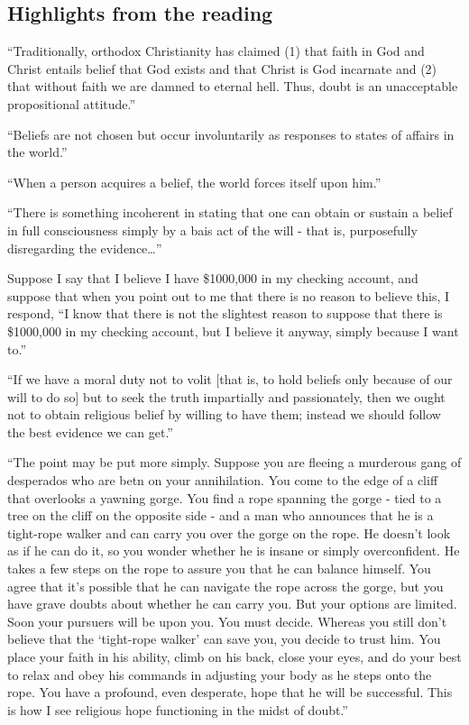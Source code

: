 \documentclass[
]{book}
\begin{document}
\hypertarget{highlights-from-the-reading-5}{%
\subsection*{Highlights from the reading}\label{highlights-from-the-reading-5}}

``Traditionally, orthodox Christianity has claimed (1) that faith in God and Christ entails belief that God exists and that Christ is God incarnate and (2) that without faith we are damned to eternal hell. Thus, doubt is an unacceptable propositional attitude.''

``Beliefs are not chosen but occur involuntarily as responses to states of affairs in the world.''

``When a person acquires a belief, the world forces itself upon him.''

``There is something incoherent in stating that one can obtain or sustain a belief in full consciousness simply by a bais act of the will - that is, purposefully disregarding the evidence\ldots{}''

Suppose I say that I believe I have \$1000,000 in my checking account, and suppose that when you point out to me that there is no reason to believe this, I respond, ``I know that there is not the slightest reason to suppose that there is \$1000,000 in my checking account, but I believe it anyway, simply because I want to.''

``If we have a moral duty not to volit {[}that is, to hold beliefs only because of our will to do so{]} but to seek the truth impartially and passionately, then we ought not to obtain religious belief by willing to have them; instead we should follow the best evidence we can get.''

``The point may be put more simply. Suppose you are fleeing a murderous gang of desperados who are betn on your annihilation. You come to the edge of a cliff that overlooks a yawning gorge. You find a rope spanning the gorge - tied to a tree on the cliff on the opposite side - and a man who announces that he is a tight-rope walker and can carry you over the gorge on the rope. He doesn't look as if he can do it, so you wonder whether he is insane or simply overconfident. He takes a few steps on the rope to assure you that he can balance himself. You agree that it's possible that he can navigate the rope across the gorge, but you have grave doubts about whether he can carry you. But your options are limited. Soon your pursuers will be upon you. You must decide. Whereas you still don't believe that the `tight-rope walker' can save you, you decide to trust him. You place your faith in his ability, climb on his back, close your eyes, and do your best to relax and obey his commands in adjusting your body as he steps onto the rope. You have a profound, even desperate, hope that he will be successful. This is how I see religious hope functioning in the midst of doubt.''
\end{document}
